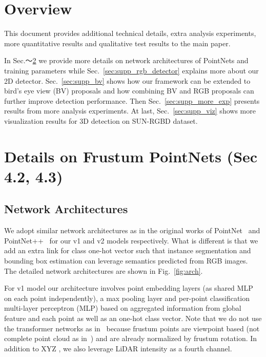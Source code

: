 \appendix
\section{Overview}
This document provides additional technical details, extra analysis experiments, more quantitative results and qualitative test results to the main paper.

In Sec.～\ref{sec:supp_pointnets} we provide more details on network architectures of PointNets and training parameters while Sec.~\ref{sec:supp_rgb_detector} explains more about our 2D detector. Sec.~\ref{sec:supp_bv} shows how our framework can be extended to bird's eye view (BV) proposals and how combining BV and RGB proposals can further improve detection performance. Then Sec.~\ref{sec:supp_more_exp} presents results from more analysis experiments. At last, Sec.~\ref{sec:supp_viz} shows more visualization results for 3D detection on SUN-RGBD dataset.

\section{Details on Frustum PointNets (Sec 4.2, 4.3)}
\label{sec:supp_pointnets}

\subsection{Network Architectures}
We adopt similar network architectures as in the original works of PointNet~\cite{qi2017pointnet} and PointNet++~\cite{qi2017pointnetplusplus} for our v1 and v2 models respectively. What is different is that we add an extra link for class one-hot vector such that instance segmentation and bounding box estimation can leverage semantics predicted from RGB images. The detailed network architectures are shown in Fig.~\ref{fig:arch}.

For v1 model our architecture involves point embedding layers (as shared MLP on each point independently), a max pooling layer and per-point classification multi-layer perceptron (MLP) based on aggregated information from global feature and each point as well as an one-hot class vector. Note that we do not use the transformer networks as in~\cite{qi2017pointnet} because frustum points are viewpoint based (not complete point cloud as in~\cite{qi2017pointnet}) and are already normalized by frustum rotation. In addition to XYZ , we also leverage LiDAR intensity as a fourth channel.

